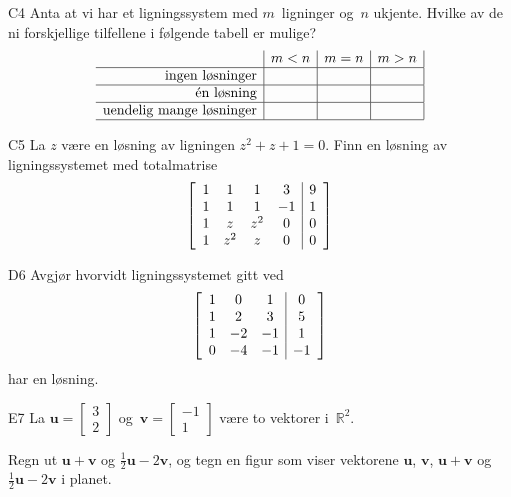 \documentclass[a4paper,norsk,11pt]{interaktiv}
\newenvironment{amatrix}[1]{%
  \left[\begin{array}{*{#1}{c}|c}
}{%
  \end{array}\right]
}
\newcommand{\V}[1]{\mathbf{#1}}
\newcommand{\vv}[2]{\begin{bmatrix} #1 \\ #2 \end{bmatrix}}
\newcommand{\R}{\mathbb{R}}
\begin{document}
\begin{oppgave}{C4}
Anta at vi har et ligningssystem med $m$~ligninger og~$n$ ukjente.
Hvilke av de ni forskjellige tilfellene i følgende tabell er mulige?
\[
\begin{array}{r|c|c|c|}
                                & m < n & m = n & m > n \\ \hline
\text{ingen løsninger}          &       &       &       \\ \hline
\text{én løsning}               &       &       &       \\ \hline
\text{uendelig mange løsninger} &       &       &       \\ \hline
\end{array}
\]
\end{oppgave}


\begin{oppgave}{C5}
La $z$ være en løsning av ligningen $z^2+z+1=0$. 
Finn en løsning av ligningssystemet med totalmatrise
\[
\begin{amatrix}{4}
1 & 1 & 1 & 3 & 9 \\
1 & 1& 1& -1& 1\\
1  & z& z^2& 0& 0\\
1     & z^2& z& 0 &0\\
\end{amatrix}
\]
\end{oppgave}


\begin{oppgave}{D6}
Avgjør hvorvidt ligningssystemet gitt ved
\[
\begin{amatrix}{3}
1 & 0 & 1 & 0 \\
1 & 2& 3&  5\\
1  & -2 & -1& 1\\
0     & -4& -1& -1\\
\end{amatrix}
\]
har en løsning.
\end{oppgave}




\begin{oppgave}{E7}
La $\V{u} = \vv{3}{2}$ og~$\V{v} = \vv{-1}{1}$ være to vektorer
i~$\R^2$.

Regn ut $\V{u} + \V{v}$ og $\frac{1}{2} \V{u} - 2 \V{v}$,
og tegn en figur som viser vektorene $\V{u}$, $\V{v}$, $\V{u} + \V{v}$ og
$\frac{1}{2} \V{u} - 2 \V{v}$ i planet.
\end{oppgave}
\end{document}
